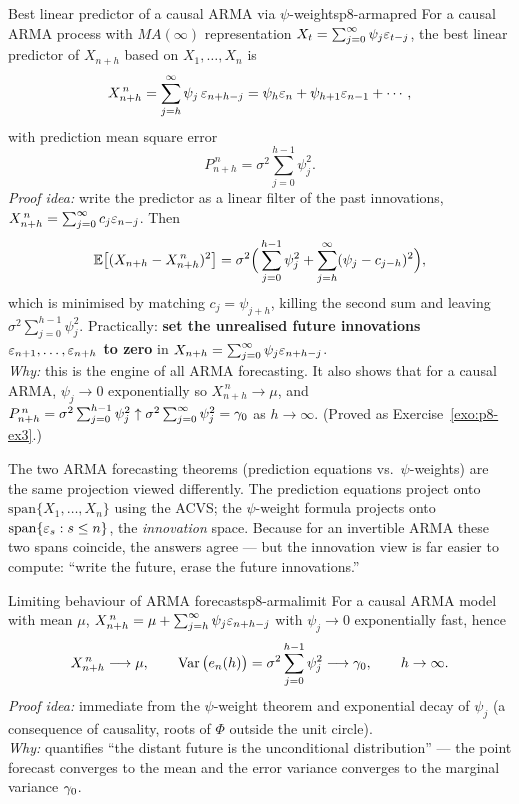 \begin{theorem}{Best linear predictor of a causal ARMA via $\psi$-weights}{p8-armapred}
For a causal ARMA process with $MA(\infty)$ representation
$X_t=\sum_{j=0}^\infty\psi_j\varepsilon_{t-j}$, the best linear predictor of $X_{n+h}$
based on $X_1,\dots,X_n$ is
\[
X^{\,n}_{n+h}=\sum_{j=h}^{\infty}\psi_j\,\varepsilon_{n+h-j}
=\psi_h\varepsilon_n+\psi_{h+1}\varepsilon_{n-1}+\cdots,
\]
with prediction mean square error
\[
P^{\,n}_{n+h}=\sigma^2\sum_{j=0}^{h-1}\psi_j^2 .
\]
\textit{Proof idea:} write the predictor as a linear filter of the past
innovations, $X^{\,n}_{n+h}=\sum_{j=0}^\infty c_j\varepsilon_{n-j}$. Then
\[
\mathbb{E}\big[(X_{n+h}-X^{\,n}_{n+h})^2\big]
=\sigma^2\Big(\sum_{j=0}^{h-1}\psi_j^2+\sum_{j=h}^\infty(\psi_j-c_{j-h})^2\Big),
\]
which is minimised by matching $c_{j}=\psi_{j+h}$, killing the second sum and
leaving $\sigma^2\sum_{j=0}^{h-1}\psi_j^2$. Practically:
\textbf{set the unrealised future innovations $\varepsilon_{n+1},\dots,\varepsilon_{n+h}$ to
zero} in $X_{n+h}=\sum_{j=0}^\infty\psi_j\varepsilon_{n+h-j}$.\\[2pt]
\textit{Why:} this is the engine of all ARMA forecasting. It also shows that for
a causal ARMA, $\psi_j\to0$ exponentially so $X^{\,n}_{n+h}\to\mu$, and
$P^{\,n}_{n+h}=\sigma^2\sum_{j=0}^{h-1}\psi_j^2\uparrow\sigma^2\sum_{j=0}^\infty\psi_j^2=\gamma_0$
as $h\to\infty$. (Proved as Exercise~\ref{exo:p8-ex3}.)
\end{theorem}

\begin{intuition}
The two ARMA forecasting theorems (prediction equations vs.\ $\psi$-weights) are
the same projection viewed differently. The prediction equations project onto
$\mathrm{span}\{X_1,\dots,X_n\}$ using the ACVS; the $\psi$-weight formula
projects onto $\mathrm{span}\{\varepsilon_s:s\le n\}$, the \emph{innovation} space.
Because for an invertible ARMA these two spans coincide, the answers agree --- but
the innovation view is far easier to compute: ``write the future, erase the
future innovations.''
\end{intuition}

\begin{proposition}{Limiting behaviour of ARMA forecasts}{p8-armalimit}
For a causal ARMA model with mean $\mu$,
$X^{\,n}_{n+h}=\mu+\sum_{j=h}^\infty\psi_j\varepsilon_{n+h-j}$ with $\psi_j\to0$
exponentially fast, hence
\[
X^{\,n}_{n+h}\longrightarrow\mu,
\qquad
\operatorname{Var}\big(e_n(h)\big)=\sigma^2\sum_{j=0}^{h-1}\psi_j^2\longrightarrow\gamma_0,
\qquad h\to\infty .
\]
\textit{Proof idea:} immediate from the $\psi$-weight theorem and exponential
decay of $\psi_j$ (a consequence of causality, roots of $\Phi$ outside the unit
circle).\\[2pt]
\textit{Why:} quantifies ``the distant future is the unconditional
distribution'' --- the point forecast converges to the mean and the error
variance converges to the marginal variance $\gamma_0$.
\end{proposition}

